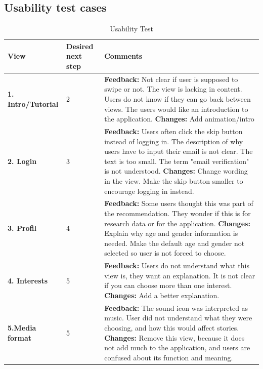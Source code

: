 \begin{appendices}
\section{Usability test cases}
\label{app:usabilitytest}
\renewcommand{\arraystretch}{2}%
\begin{center}
	\small
	\begin{longtable}{ | p{2cm} | p{1cm} | p{13cm}|}
		\caption[Usability test]{Usability Test } \label{Tab:usabilityTest}\\
		\hline
		\textbf{View} & \textbf{Desired next step} & \textbf{Comments}
		\\ \hline
		
		\textbf{1. Intro/Tutorial} & 2 & 
		\textbf{Feedback:} Not clear if user is supposed to swipe or not. The view is lacking in content. Users do not know if they can go back between views. The users would like an introduction to the application.\newline
		\textbf{Changes:} Add animation/intro
		\\\hline
		
		\textbf{2. Login} & 3  & 
		\textbf{Feedback:} Users often click the skip button instead of logging in. The description of why users have to input their email is not clear. The text is too small. The term "email verification" is not understood.\newline
		\textbf{Changes:} Change wording in the view. Make the skip button smaller to encourage logging in instead.
		\\\hline
		
		\textbf{3. Profil} & 4 & 
		\textbf{Feedback:} Some users thought this was part of the recommendation. They wonder if this is for research data or for the application.\newline
		\textbf{Changes:} Explain why age and gender information is needed. Make the default age and gender not selected so user is not forced to choose.
		\\\hline
		
		\textbf{4. Interests} & 5  & 
		\textbf{Feedback:} Users do not understand what this view is, they want an explanation. It is not clear if you can choose more than one interest.\newline		
		\textbf{Changes:} Add a better explanation.
		\\\hline
		
		\textbf{5.Media format} & 5 & 
		\textbf{Feedback:} The sound icon was interpreted as music. User did not understand what they were choosing, and how this would affect stories.\newline
		\textbf{Changes:} Remove this view, because it does not add much to the application, and users are confused about its function and meaning.
		\\\hline
		

\end{longtable}
\end{center}
\end{appendices}
